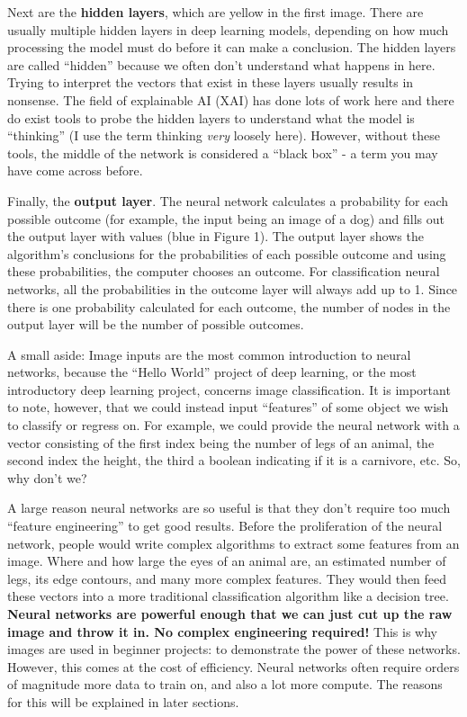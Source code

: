     \large {Next are the \textbf{hidden layers}, which are yellow in the first image. There are usually multiple hidden layers in deep learning models, depending on how much processing the model must do before it can make a conclusion. The hidden layers are called ``hidden'' because we often don't understand what happens in here. Trying to interpret the vectors that exist in these layers usually results in nonsense. The field of explainable AI (XAI) has done lots of work here and there do exist tools to probe the hidden layers to understand what the model is ``thinking'' (I use the term thinking \textit{very} loosely here). However, without these tools, the middle of the network is considered a ``black box'' - a term you may have come across before. 
    
    Finally, the \textbf{output layer}. The neural network calculates a probability for each possible outcome (for example, the input being an image of a dog) and fills out the output layer with values (blue in Figure 1). The output layer shows the algorithm's conclusions for the probabilities of each possible outcome and using these probabilities, the computer chooses an outcome. For classification neural networks, all the probabilities in the outcome layer will always add up to 1. Since there is one probability calculated for each outcome, the number of nodes in the output layer will be the number of possible outcomes. 
    
    A small aside: Image inputs are the most common introduction to neural networks, because the ``Hello World'' project of deep learning, or the most introductory deep learning project, concerns image classification. It is important to note, however, that we could instead input ``features'' of some object we wish to classify or regress on. For example, we could provide the neural network with a vector consisting of the first index being the number of legs of an animal, the second index the height, the third a boolean indicating if it is a carnivore, etc. So, why don't we? 
    
    A large reason neural networks are so useful is that they don't require too much ``feature engineering'' to get good results. Before the proliferation of the neural network, people would write complex algorithms to extract some features from an image. Where and how large the eyes of an animal are, an estimated number of legs, its edge contours, and many more complex features. They would then feed these vectors into a more traditional classification algorithm like a decision tree. \textbf{Neural networks are powerful enough that we can just cut up the raw image and throw it in. No complex engineering required!} This is why images are used in beginner projects: to demonstrate the power of these networks. However, this comes at the cost of efficiency. Neural networks often require orders of magnitude more data to train on, and also a lot more compute. The reasons for this will be explained in later sections.}
